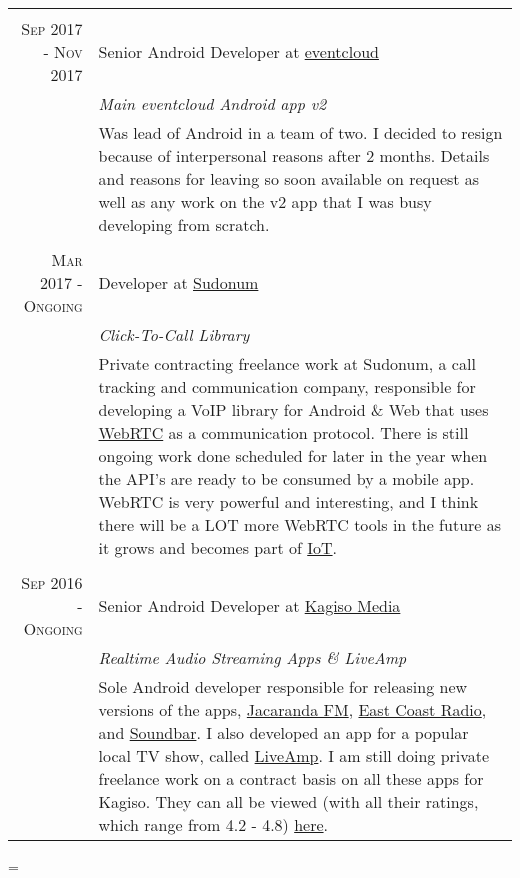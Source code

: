 \documentclass[a4paper,10pt,notitlepage]{article}
\newenvironment{absolutelynopagebreak}
  {\par\nobreak\vfil\penalty0\vfilneg
   \vtop\bgroup}
  {\par\xdef\tpd{\the\prevdepth}\egroup
   \prevdepth=\tpd}
\begin{document}
\begin{absolutelynopagebreak}
\begin{tabular}{r|p{11cm}}
		\multicolumn{2}{c}{} \\
		
		\textsc{Sep 2017 - Nov 2017} & Senior Android Developer at \href{www.eventcloud.co}{eventcloud}
		\\&\emph{Main eventcloud Android app v2}\\&\footnotesize{Was lead of Android in a team of two. I decided to resign because of interpersonal reasons after 2 months. Details and reasons for leaving so soon available on request as well as any work on the v2 app that I was busy developing from scratch.} \\
		
		\multicolumn{2}{c}{} \\
		
		\textsc{Mar 2017 - Ongoing}  & Developer at \href{www.sudonum.com}{Sudonum}
		\\&\emph{Click-To-Call Library}\\&\footnotesize{Private contracting freelance work at Sudonum, a call tracking and communication company, responsible for developing a VoIP library for Android \& Web that uses \href{https://en.wikipedia.org/wiki/WebRTC}{WebRTC} as a communication protocol. There is still ongoing work done scheduled for later in the year when the API's are ready to be consumed by a mobile app. WebRTC is very powerful and interesting, and I think there will be a LOT more WebRTC tools in the future as it grows and becomes part of
		\href{https://en.wikipedia.org/wiki/Internet_of_things}{IoT}.} \\
		
		\multicolumn{2}{c}{} \\
		\textsc{Sep 2016 - Ongoing}  & Senior Android Developer at \href{www.kagisomedia.co.za}{Kagiso Media}                                               \\&\emph{Realtime Audio Streaming Apps \& LiveAmp}\\&\footnotesize{Sole Android developer responsible for releasing new versions of the apps, \href{https://play.google.com/store/apps/details?id=com.kagiso.jacarandafm}{Jacaranda FM},  \href{https://play.google.com/store/apps/details?id=com.kagiso.ecr}{East Coast Radio}, and \href{https://play.google.com/store/apps/details?id=com.kagiso.soundbar}{Soundbar}. I also developed an app for a popular local TV show, called  \href{https://play.google.com/store/apps/details?id=com.kagiso.liveamp}{LiveAmp}. I am still doing private freelance work on a contract basis on all these apps for Kagiso. They can all be viewed (with all their ratings, which range from 4.2 - 4.8) \href{https://play.google.com/store/apps/developer?id=Kagiso+Media}{here}}. \\
		

\end{tabular}
\end{absolutelynopagebreak}
\end{document}
